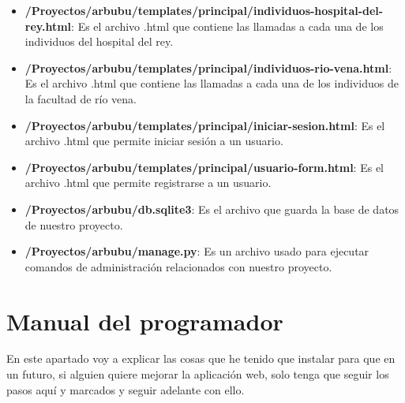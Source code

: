 \begin{itemize}
\begin{itemize}
\begin{itemize}
\begin{itemize}
				\item \textbf{/Proyectos/arbubu/templates/principal/individuos-hospital-del-rey.html}: Es el archivo .html que contiene las llamadas a cada una de los individuos del hospital del rey.
				\item \textbf{/Proyectos/arbubu/templates/principal/individuos-rio-vena.html}: Es el archivo .html que contiene las llamadas a cada una de los individuos de la facultad de río vena.
				\item \textbf{/Proyectos/arbubu/templates/principal/iniciar-sesion.html}: Es el archivo .html que permite iniciar sesión a un usuario.
				\item \textbf{/Proyectos/arbubu/templates/principal/usuario-form.html}: Es el archivo .html que permite registrarse a un usuario.
				\item \textbf{/Proyectos/arbubu/db.sqlite3}: Es el archivo que guarda la base de datos de nuestro proyecto.
				\item \textbf{/Proyectos/arbubu/manage.py}: Es un archivo usado para ejecutar comandos de administración relacionados con nuestro proyecto.
			\end{itemize}
		\end{itemize}
	\end{itemize}
\end{itemize}
\section{Manual del programador}

En este apartado voy a explicar las cosas que he tenido que instalar para que en un futuro, si alguien quiere mejorar la aplicación web, solo tenga que seguir los pasos aquí y marcados y seguir adelante con ello.

